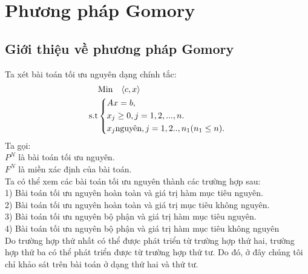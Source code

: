 \documentclass[12pt,a4paper]{report}
\begin{document}
\section{Phương pháp Gomory}
\subsection{ Giới thiệu về phương pháp Gomory}
Ta xét bài toán tối ưu nguyên dạng chính tắc:\\
\begin{equation}\label{BTNchinhtac}
     \begin{split}
          & {\rm{Min}}  \quad\langle c,x \rangle\\
          \rm{s.t} &\left\{\begin{split}
            & Ax= b,\\
           & x_j \ge 0, j=1,2,...,n.\\
            & x_j \text{nguyên}, j=1,2..,n_1 (n_1\le n).\\
           \end{split}\right.
       \end{split}
   \end{equation}
   Ta gọi:\\
   $P^N$ là bài toán tối ưu nguyên.\\
$F^N$ là miền xác định của bài toán.\\

   Ta có thể xem các bài toán tối ưu nguyên thành các trường hợp sau:\\
   1) Bài toán tối ưu nguyên hoàn toàn và giá trị hàm mục tiêu nguyên.\\
   2) Bài toán tối ưu nguyên hoàn toàn và giá trị mục tiêu không nguyên.\\
   3) Bài toán tối ưu nguyên bộ phận và giá trị hàm mục tiêu nguyên.\\
   4) Bài toán tối ưu nguyên bộ phận và giá trị hàm mục tiêu không nguyên\\
   Do trường hợp thứ nhất có thể được phát triển từ trường hợp thứ hai, trường hợp thứ ba có thể phát triển được từ trường hợp thứ tư. Do đó, ở đây chúng tôi chỉ khảo sát trên bài toán ở dạng thứ hai và thứ tư.\\
\end{document}
